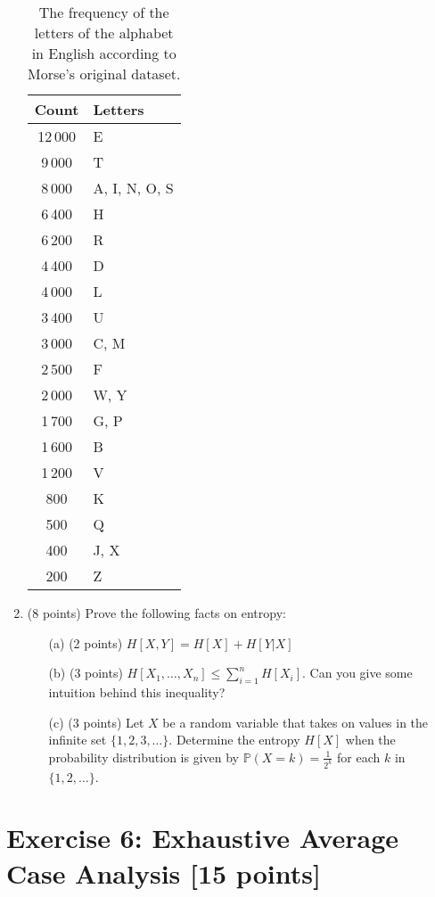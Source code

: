 \documentclass[11pt]{article}
\theoremstyle{theorem}
\theoremstyle{lemma}
\theoremstyle{corollary}
\theoremstyle{definition}
\begin{document}
\begin{enumerate}
 \begin{table}[]
    \centering
\begin{tabular}{|c|l|}
\hline
\textbf{Count} & \textbf{Letters} \\
\hline
12\,000 & E \\
9\,000 & T \\
8\,000 & A, I, N, O, S \\
6\,400 & H \\
6\,200 & R \\
4\,400 & D \\
4\,000 & L \\
3\,400 & U \\
3\,000 & C, M \\
2\,500 & F \\
2\,000 & W, Y \\
1\,700 & G, P \\
1\,600 & B \\
1\,200 & V \\
800 & K \\
500 & Q \\
400 & J, X \\
200 & Z \\
\hline
\end{tabular}
    \caption{The frequency of the letters of the alphabet in English according to Morse's original dataset.}
    \label{tab:morse}
\end{table}

 \item  (8 points) Prove the following facts on entropy: 
 \begin{itemize}
     \item [ (a) ]   (2 points) $H[X,Y] = H[X] + H[Y|X]$
     \item [ (b) ]  (3 points) $H[X_1,\ldots, X_n] \leq \sum_{i=1}^n H[X_i]$. Can you give some intuition behind this inequality?
     \item [ (c)]  (3 points) Let $X$ be a random variable that takes on values in the infinite set $\{1, 2, 3, \dots\}$. Determine the entropy $H[X]$ when the probability distribution is given by $\mathbb{P}(X=k) = \frac{1}{2^k}$ for each $k$ in $\{1, 2, \dots\}$. 

 \end{itemize}
 \end{enumerate}
 

\section*{Exercise 6: Exhaustive Average Case Analysis [15 points]} 
\end{document}
